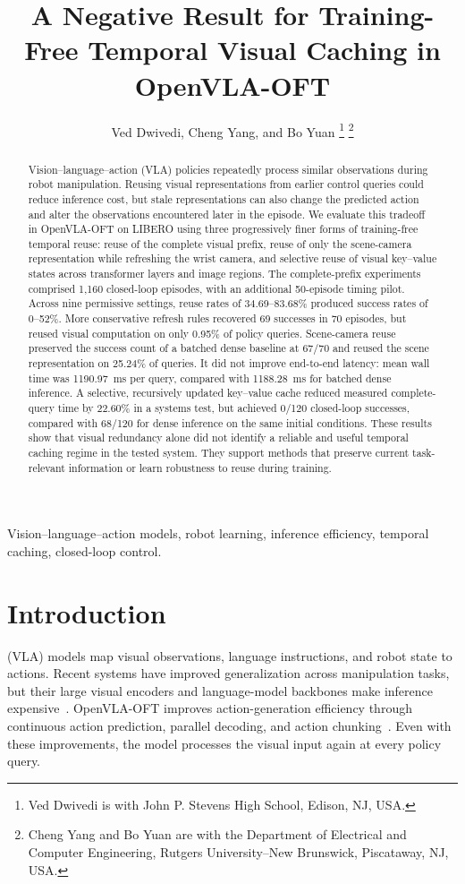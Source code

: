 \documentclass[journal]{IEEEtran}
\title{A Negative Result for Training-Free Temporal Visual Caching in OpenVLA-OFT}
\author{Ved Dwivedi, Cheng Yang, and Bo Yuan%
\thanks{Ved Dwivedi is with John P. Stevens High School, Edison, NJ, USA.}%
\thanks{Cheng Yang and Bo Yuan are with the Department of Electrical and Computer Engineering, Rutgers University--New Brunswick, Piscataway, NJ, USA.}}
\begin{document}
\maketitle

\begin{abstract}
Vision--language--action (VLA) policies repeatedly process similar observations during robot manipulation. Reusing visual representations from earlier control queries could reduce inference cost, but stale representations can also change the predicted action and alter the observations encountered later in the episode. We evaluate this tradeoff in OpenVLA-OFT on LIBERO using three progressively finer forms of training-free temporal reuse: reuse of the complete visual prefix, reuse of only the scene-camera representation while refreshing the wrist camera, and selective reuse of visual key--value states across transformer layers and image regions. The complete-prefix experiments comprised 1,160 closed-loop episodes, with an additional 50-episode timing pilot. Across nine permissive settings, reuse rates of 34.69--83.68\% produced success rates of 0--52\%. More conservative refresh rules recovered 69 successes in 70 episodes, but reused visual computation on only 0.95\% of policy queries. Scene-camera reuse preserved the success count of a batched dense baseline at 67/70 and reused the scene representation on 25.24\% of queries. It did not improve end-to-end latency: mean wall time was 1190.97~ms per query, compared with 1188.28~ms for batched dense inference. A selective, recursively updated key--value cache reduced measured complete-query time by 22.60\% in a systems test, but achieved 0/120 closed-loop successes, compared with 68/120 for dense inference on the same initial conditions. These results show that visual redundancy alone did not identify a reliable and useful temporal caching regime in the tested system. They support methods that preserve current task-relevant information or learn robustness to reuse during training.
\end{abstract}

\begin{IEEEkeywords}
Vision--language--action models, robot learning, inference efficiency, temporal caching, closed-loop control.
\end{IEEEkeywords}

\section{Introduction}
 (VLA) models map visual observations, language instructions, and robot state to actions. Recent systems have improved generalization across manipulation tasks, but their large visual encoders and language-model backbones make inference expensive~\cite{brohan2023rt1,zitkovich2023rt2,kim2025openvla}. OpenVLA-OFT improves action-generation efficiency through continuous action prediction, parallel decoding, and action chunking~\cite{kim2025oft}. Even with these improvements, the model processes the visual input again at every policy query.
\end{document}

